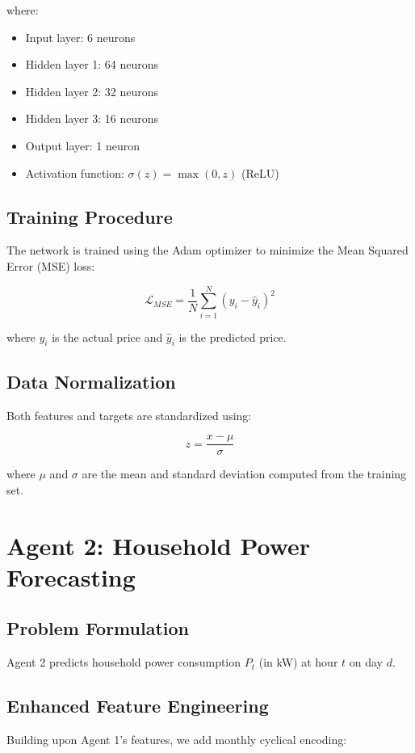 \documentclass[conference]{IEEEtran}
\begin{document}
where:
\begin{itemize}
    \item Input layer: 6 neurons
    \item Hidden layer 1: 64 neurons
    \item Hidden layer 2: 32 neurons
    \item Hidden layer 3: 16 neurons
    \item Output layer: 1 neuron
    \item Activation function: $\sigma(z) = \max(0, z)$ (ReLU)
\end{itemize}

\subsection{Training Procedure}
The network is trained using the Adam optimizer to minimize the Mean Squared Error (MSE) loss:

\begin{equation}
\mathcal{L}_{MSE} = \frac{1}{N}\sum_{i=1}^{N}(y_i - \hat{y}_i)^2
\end{equation}

where $y_i$ is the actual price and $\hat{y}_i$ is the predicted price.

\subsection{Data Normalization}
Both features and targets are standardized using:

\begin{equation}
z = \frac{x - \mu}{\sigma}
\end{equation}

where $\mu$ and $\sigma$ are the mean and standard deviation computed from the training set.

\section{Agent 2: Household Power Forecasting}

\subsection{Problem Formulation}
Agent 2 predicts household power consumption $P_t$ (in kW) at hour $t$ on day $d$.

\subsection{Enhanced Feature Engineering}
Building upon Agent 1's features, we add monthly cyclical encoding:
\end{document}
